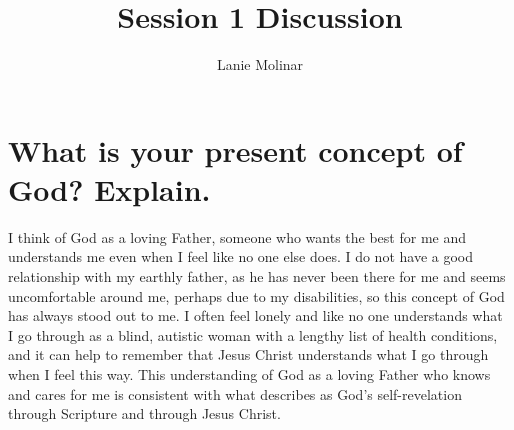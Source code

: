 \documentclass[stu,12pt,floatsintext]{apa7}
\title{Session 1 Discussion}
\author{Lanie Molinar}
\begin{document}
\maketitle
\thispagestyle{plain}
\pagestyle{plain}

\section{What is your present concept of God? Explain.}
I think of God as a loving Father, someone who wants the best for me and understands me even when I feel like no one else does. I do not have a good relationship with my earthly father, as he has never been there for me and seems uncomfortable around me, perhaps due to my disabilities, so this concept of God has always stood out to me. I often feel lonely and like no one understands what I go through as a blind, autistic woman with a lengthy list of health conditions, and it can help to remember that Jesus Christ understands what I go through when I feel this way. This understanding of God as a loving Father who knows and cares for me is consistent with what \textcite{erickson_introducing_2015} describes as God’s self-revelation through Scripture and through Jesus Christ.

\printbibliography
\end{document}
